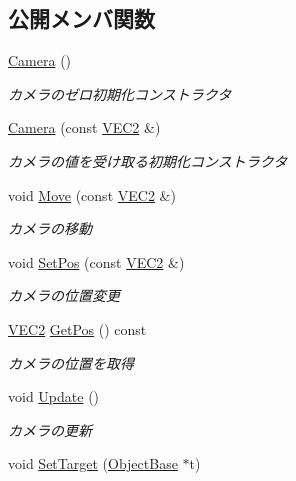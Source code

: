\subsection*{公開メンバ関数}
\begin{DoxyCompactItemize}
\item 
\mbox{\hyperlink{class_camera_a01f94c3543f56ede7af49dc778f19331}{Camera}} ()
\begin{DoxyCompactList}\small\item\em カメラのゼロ初期化コンストラクタ \end{DoxyCompactList}\item 
\mbox{\hyperlink{class_camera_afe282ee51f1f39c041b0e7de9386cc6d}{Camera}} (const \mbox{\hyperlink{transform_8h_afb0c5e21d4133ff4f200992c0b534e1b}{V\+E\+C2}} \&)
\begin{DoxyCompactList}\small\item\em カメラの値を受け取る初期化コンストラクタ \end{DoxyCompactList}\item 
void \mbox{\hyperlink{class_camera_a5c6b7ad424d835a3022393099886a90b}{Move}} (const \mbox{\hyperlink{transform_8h_afb0c5e21d4133ff4f200992c0b534e1b}{V\+E\+C2}} \&)
\begin{DoxyCompactList}\small\item\em カメラの移動 \end{DoxyCompactList}\item 
void \mbox{\hyperlink{class_camera_af79aa3fedd030712e7fa122a2ea88b48}{Set\+Pos}} (const \mbox{\hyperlink{transform_8h_afb0c5e21d4133ff4f200992c0b534e1b}{V\+E\+C2}} \&)
\begin{DoxyCompactList}\small\item\em カメラの位置変更 \end{DoxyCompactList}\item 
\mbox{\hyperlink{transform_8h_afb0c5e21d4133ff4f200992c0b534e1b}{V\+E\+C2}} \mbox{\hyperlink{class_camera_ac3b4f1248489c0ac0faa521329de71cd}{Get\+Pos}} () const
\begin{DoxyCompactList}\small\item\em カメラの位置を取得 \end{DoxyCompactList}\item 
void \mbox{\hyperlink{class_camera_a4a596a3ea1fdc7d244ba4268031a360b}{Update}} ()
\begin{DoxyCompactList}\small\item\em カメラの更新 \end{DoxyCompactList}\item 
void \mbox{\hyperlink{class_camera_a7336f8f6c9145bee1ce6b1f16f0aaee4}{Set\+Target}} (\mbox{\hyperlink{class_object_base}{Object\+Base}} $\ast$t)
\end{DoxyCompactItemize}
